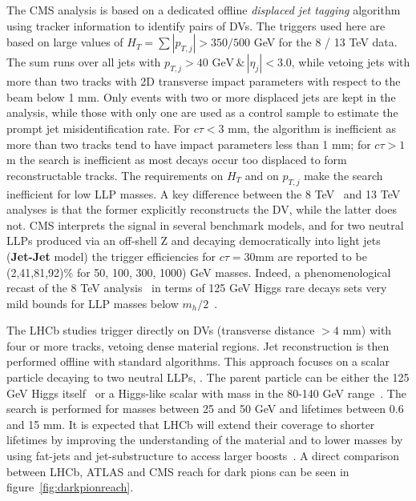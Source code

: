 The CMS analysis is based on a dedicated offline \emph{displaced jet tagging} algorithm using tracker information to identify pairs of DVs. The triggers used here are based on large values of $H_T =  \sum | p_{T,j} |  > 350 / 500 $ GeV for the 8 / 13 TeV data. The sum runs over all jets with $p_{T,j}> 40 \mbox{ GeV}\,\&\, |\eta_j| < 3.0$, while vetoing jets with more than two tracks with 2D transverse impact parameters with respect to the beam below 1 mm. Only events with two or more displaced jets are kept in the analysis, while those with only one are used as a control sample to estimate the prompt jet misidentification rate. For $c \tau < 3$ mm, the algorithm is inefficient as more than two tracks tend to have impact parameters less than 1 mm; for $c \tau > 1$ m the search is inefficient as most decays occur too displaced to form reconstructable tracks. The requirements on $H_T$ and on $p_{T,j}$ make the search inefficient for low LLP masses. A key difference between the 8 TeV~\cite{Khachatryan:2015wka} and 13 TeV~\cite{CMS:2017oor} analyses is that the former explicitly reconstructs the DV, while the latter does not. CMS interprets the signal in several benchmark models, and for two neutral LLPs produced via an  off-shell Z and decaying democratically into light jets ({\bf Jet-Jet }model)  the trigger efficiencies for $c \tau= 30 $mm are reported to be (2,41,81,92)\% for 50, 100, 300, 1000) GeV masses. Indeed, a phenomenological recast of the 8 TeV analysis~\cite{CMS:2014wda} in terms of 125 GeV Higgs rare decays sets very mild bounds for LLP masses below $m_h / 2$~\cite{Csaki:2015fba}.

The LHCb studies \cite{Aaij:2016isa,Aaij:2017mic} trigger directly on DVs (transverse distance $> 4$ mm) with four or more tracks, vetoing dense material regions.  Jet reconstruction is then performed offline with standard algorithms.  This approach focuses on a scalar particle decaying to two neutral LLPs, \piv.  The parent particle can be either the 125 GeV Higgs itself~\cite{Aaij:2017mic} or a Higgs-like scalar with mass in the 80-140 GeV range~\cite{Aaij:2016isa}.  The search is performed for \piv masses between 25 and 50 GeV and lifetimes between 0.6 and 15 mm. It is expected that LHCb will extend their coverage to shorter lifetimes by improving the understanding of the material and to lower masses by using fat-jets and jet-substructure to access larger boosts~\cite{Vaszquez:2017workshop}. A direct comparison between LHCb, ATLAS and CMS reach for dark pions can be seen in figure~\ref{fig:darkpionreach}.

